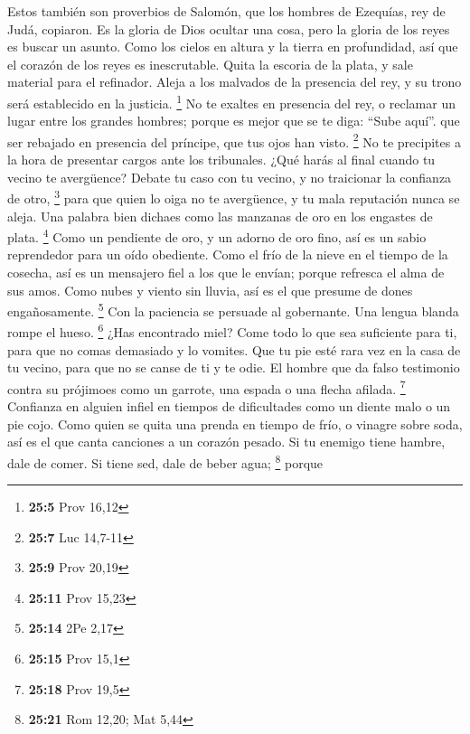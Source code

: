  Estos también son proverbios de Salomón, que los hombres
de Ezequías, rey de Judá, copiaron.  Es la gloria de Dios
ocultar una cosa, pero la gloria de los reyes es buscar un asunto.
 Como los cielos en altura y la tierra en profundidad, así
que el corazón de los reyes es inescrutable.  Quita la
escoria de la plata, y sale material para el refinador. 
Aleja a los malvados de la presencia del rey, y su trono será
establecido en la justicia. \footnote{\textbf{25:5} Prov 16,12}
 No te exaltes en presencia del rey, o reclamar un lugar
entre los grandes hombres;  porque es mejor que se te
diga: ``Sube aquí''. que ser rebajado en presencia del príncipe, que tus
ojos han visto. \footnote{\textbf{25:7} Luc 14,7-11}  No
te precipites a la hora de presentar cargos ante los tribunales. ¿Qué
harás al final cuando tu vecino te avergüence?  Debate tu
caso con tu vecino, y no traicionar la confianza de otro, \footnote{\textbf{25:9}
  Prov 20,19}  para que quien lo oiga no te avergüence, y
tu mala reputación nunca se aleja.  Una palabra bien
dichaes como las manzanas de oro en los engastes de plata. \footnote{\textbf{25:11}
  Prov 15,23}  Como un pendiente de oro, y un adorno de
oro fino, así es un sabio reprendedor para un oído obediente.
 Como el frío de la nieve en el tiempo de la cosecha, así
es un mensajero fiel a los que le envían; porque refresca el alma de sus
amos.  Como nubes y viento sin lluvia, así es el que
presume de dones engañosamente. \footnote{\textbf{25:14} 2Pe 2,17}
 Con la paciencia se persuade al gobernante. Una lengua
blanda rompe el hueso. \footnote{\textbf{25:15} Prov 15,1}
 ¿Has encontrado miel? Come todo lo que sea suficiente
para ti, para que no comas demasiado y lo vomites.  Que
tu pie esté rara vez en la casa de tu vecino, para que no se canse de ti
y te odie.  El hombre que da falso testimonio contra su
prójimoes como un garrote, una espada o una flecha afilada. \footnote{\textbf{25:18}
  Prov 19,5}  Confianza en alguien infiel en tiempos de
dificultades como un diente malo o un pie cojo.  Como
quien se quita una prenda en tiempo de frío, o vinagre sobre soda, así
es el que canta canciones a un corazón pesado.  Si tu
enemigo tiene hambre, dale de comer. Si tiene sed, dale de beber agua;
\footnote{\textbf{25:21} Rom 12,20; Mat 5,44}  porque
